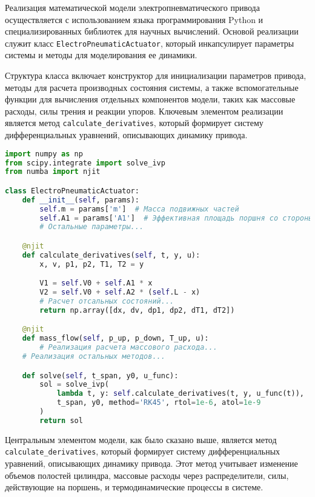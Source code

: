 Реализация математической модели электропневматического привода осуществляется с использованием языка программирования Python
и специализированных библиотек для научных вычислений. Основой реализации служит класс \texttt{ElectroPneumaticActuator},
который инкапсулирует параметры системы и методы для моделирования ее динамики.

Структура класса включает конструктор для инициализации параметров привода, методы для расчета производных состояния системы,
а также вспомогательные функции для вычисления отдельных компонентов модели, таких как массовые расходы, силы трения и реакции упоров.
Ключевым элементом реализации является метод \texttt{calculate\_derivatives}, который формирует систему дифференциальных уравнений,
описывающих динамику привода.

\begin{ListingEnv}[!h]%
    \captiondelim{ } %
    \caption{ \protect\python}\label{lst:hwbeauty}
    \begin{lstlisting}[language={Python}]
import numpy as np
from scipy.integrate import solve_ivp
from numba import njit

class ElectroPneumaticActuator:
    def __init__(self, params):
        self.m = params['m']  # Масса подвижных частей
        self.A1 = params['A1']  # Эффективная площадь поршня со стороны штока
        # Остальные параметры...

    @njit
    def calculate_derivatives(self, t, y, u):
        x, v, p1, p2, T1, T2 = y

        V1 = self.V0 + self.A1 * x
        V2 = self.V0 + self.A2 * (self.L - x)
        # Расчет отсальных состояний...
        return np.array([dx, dv, dp1, dp2, dT1, dT2])

    @njit
    def mass_flow(self, p_up, p_down, T_up, u):
        # Реализация расчета массового расхода...
    # Реализация остальных методов...

    def solve(self, t_span, y0, u_func):
        sol = solve_ivp(
            lambda t, y: self.calculate_derivatives(t, y, u_func(t)),
            t_span, y0, method='RK45', rtol=1e-6, atol=1e-9
        )
        return sol
    \end{lstlisting}
\end{ListingEnv}%

Центральным элементом модели, как было сказано выше, является метод \texttt{calculate\_derivatives},
который формирует систему дифференциальных уравнений, описывающих динамику привода.
Этот метод учитывает изменение объемов полостей цилиндра, массовые расходы через
распределители, силы, действующие на поршень, и термодинамические процессы в системе.

